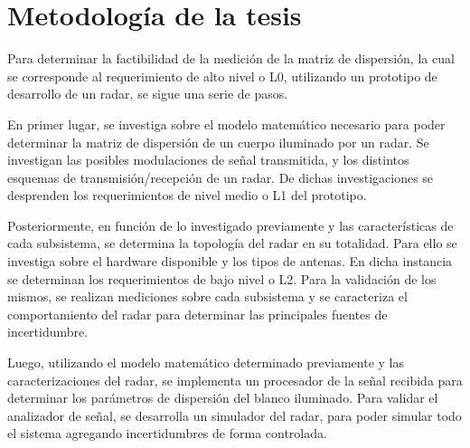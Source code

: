 \section{Metodología de la tesis} \label{sc:methodology}

Para determinar la factibilidad de la medición de la matriz de dispersión, la cual se corresponde al requerimiento de alto nivel o L0, utilizando un prototipo de desarrollo de un radar, se sigue una serie de pasos. 


En primer lugar, se investiga sobre el modelo matemático necesario para poder determinar la matriz de dispersión de un cuerpo iluminado por un radar. Se investigan las posibles modulaciones de señal transmitida, y los distintos esquemas de transmisión/recepción de un radar. De dichas investigaciones se desprenden los requerimientos de nivel medio o L1 del prototipo.


Posteriormente, en función de lo investigado previamente y las características de cada subsistema, se determina la topología del radar en su totalidad. Para ello se investiga sobre el hardware disponible y los tipos de antenas. En dicha instancia se determinan los requerimientos de bajo nivel o L2. Para la validación de los mismos, se realizan mediciones sobre cada subsistema y se caracteriza el comportamiento del radar para determinar las principales fuentes de incertidumbre.

Luego, utilizando el modelo matemático determinado previamente y las caracterizaciones del radar, se implementa un procesador de la señal recibida para determinar los parámetros de dispersión del blanco iluminado. Para validar el analizador de señal, se desarrolla un simulador del radar, para poder simular todo el sistema agregando incertidumbres de forma controlada.

